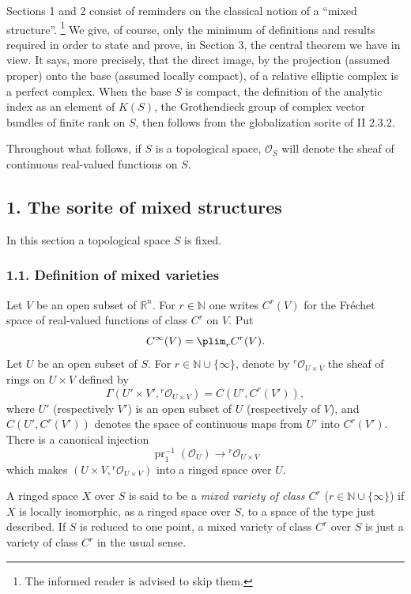 Sections 1 and 2 consist of reminders on the classical notion of a ``mixed structure''.
\footnote{The informed reader is advised to skip them.}
We give, of course, only the minimum of definitions and results required in order to state and prove, in Section 3, the central theorem we have in view. It says, more precisely, that the direct image, by the projection (assumed proper) onto the base (assumed locally compact), of a relative elliptic complex is a perfect complex. When the base $S$ is compact, the definition of the analytic index as an element of $K(S)$, the Grothendieck group of complex vector bundles of finite rank on $S$, then follows from the globalization sorite of II 2.3.2.

Throughout what follows, if $S$ is a topological space, $\mathcal O_S$ will denote the sheaf of continuous real-valued functions on $S$.

\subsection*{1. The sorite of mixed structures}

In this section a topological space $S$ is fixed.

\subsubsection*{1.1. Definition of mixed varieties}

Let $V$ be an open subset of $\mathbb R^n$. For $r\in\mathbb N$ one writes $C^r(V)$ for the Fréchet space of real-valued functions of class $C^r$ on $V$. Put
\[
 C^\infty(V)=\plim_r C^r(V).
\]
Let $U$ be an open subset of $S$. For $r\in\mathbb N\cup\{\infty\}$, denote by ${}^r\mathcal O_{U\times V}$ the sheaf of rings on $U\times V$ defined by
\[
 \Gamma(U'\times V',{}^r\mathcal O_{U\times V})
 =C(U',C^r(V')),
\]
where $U'$ (respectively $V'$) is an open subset of $U$ (respectively of $V$), and $C(U',C^r(V'))$ denotes the space of continuous maps from $U'$ into $C^r(V')$. There is a canonical injection
\[
 \operatorname{pr}_1^{-1}(\mathcal O_U)\longrightarrow {}^r\mathcal O_{U\times V}
\]
which makes $(U\times V,{}^r\mathcal O_{U\times V})$ into a ringed space over $U$.

A ringed space $X$ over $S$ is said to be a \emph{mixed variety of class $C^r$} ($r\in\mathbb N\cup\{\infty\}$) if $X$ is locally isomorphic, as a ringed space over $S$, to a space of the type just described. If $S$ is reduced to one point, a mixed variety of class $C^r$ over $S$ is just a variety of class $C^r$ in the usual sense.

